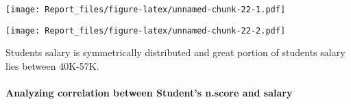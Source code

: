 \documentclass[
]{article}
\newenvironment{Shaded}{\begin{snugshade}}{\end{snugshade}}
\newcommand{\DataTypeTok}[1]{\textcolor[rgb]{0.13,0.29,0.53}{#1}}
\newcommand{\DecValTok}[1]{\textcolor[rgb]{0.00,0.00,0.81}{#1}}
\newcommand{\KeywordTok}[1]{\textcolor[rgb]{0.13,0.29,0.53}{\textbf{#1}}}
\newcommand{\NormalTok}[1]{#1}
\newcommand{\OperatorTok}[1]{\textcolor[rgb]{0.81,0.36,0.00}{\textbf{#1}}}
\newcommand{\StringTok}[1]{\textcolor[rgb]{0.31,0.60,0.02}{#1}}
\begin{document}
\texttt{[image: Report\_files/figure-latex/unnamed-chunk-22-1.pdf]}

\begin{Shaded}
\end{Shaded}

\texttt{[image: Report\_files/figure-latex/unnamed-chunk-22-2.pdf]}

Students salary is symmetrically distributed and great portion of
students salary lies between 40K-57K.

\hypertarget{analyzing-correlation-between-students-n.score-and-salary}{%
\paragraph{Analyzing correlation between Student's n.score and
salary}\label{analyzing-correlation-between-students-n.score-and-salary}}
\end{document}
